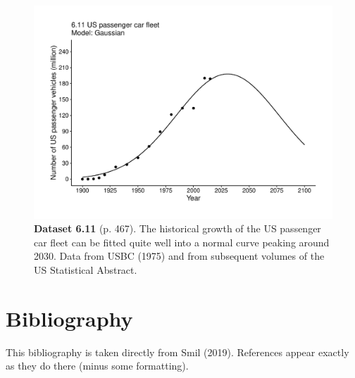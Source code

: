 \documentclass[aps,rmp,preprint,superscriptaddress,10pt,onecolumn]{article}
\begin{document}
\clearpage
\begin{figure}[h]
\includegraphics[width=\textwidth]{output/figs-ggplot/6.11.pdf}
\caption*{\textbf{Dataset 6.11} (p. 467). The historical growth of the US passenger car fleet can be fitted quite well into a normal curve peaking around 2030. Data from USBC (1975) and from subsequent volumes of the US Statistical Abstract. }
\end{figure}
	
\section*{Bibliography}

This bibliography is taken directly from Smil (2019). References appear exactly as they do there (minus some formatting). \par\par
\end{document}
